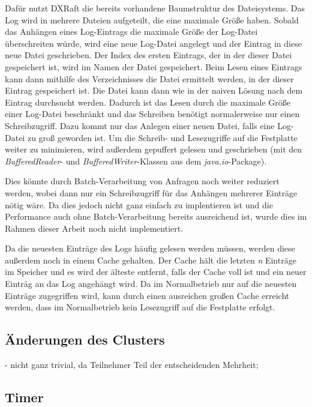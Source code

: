 Dafür nutzt DXRaft die bereits vorhandene Baumstruktur des Dateisystems. Das Log wird in mehrere Dateien aufgeteilt, die eine maximale Größe haben. Sobald das Anhängen eines Log-Eintrags die maximale Größe der Log-Datei überschreiten würde, wird eine neue Log-Datei angelegt und der Eintrag in diese neue Datei geschrieben. Der Index des ersten Eintrags, der in der dieser Datei gespeichert ist, wird im Namen der Datei gespeichert. Beim Lesen eines Eintrags kann dann mithilfe des Verzeichnisses die Datei ermittelt werden, in der dieser Eintrag gespeichert ist. Die Datei kann dann wie in der naiven Lösung nach dem Eintrag durchsucht werden. Dadurch ist das Lesen durch die maximale Größe einer Log-Datei beschränkt und das Schreiben benötigt normalerweise nur einen Schreibzugriff. Dazu kommt nur das Anlegen einer neuen Datei, falls eine Log-Datei zu groß geworden ist. Um die Schreib- und Lesezugriffe auf die Festplatte weiter zu minimieren, wird außerdem gepuffert gelesen und geschrieben (mit den \textit{BufferedReader}- und \textit{BufferedWriter}-Klassen aus dem \textit{java.io}-Package).
		
Dies könnte durch Batch-Verarbeitung von Anfragen noch weiter reduziert werden, wobei dann nur ein Schreibzugriff für das Anhängen mehrerer Einträge nötig wäre. Da dies jedoch nicht ganz einfach zu implentieren ist und die Performance auch ohne Batch-Verarbeitung bereits ausreichend ist, wurde dies im Rahmen dieser Arbeit noch nicht implementiert.

Da die neuesten Einträge des Logs häufig gelesen werden müssen, werden diese außerdem noch in einem Cache gehalten. Der Cache hält die letzten \textit{n} Einträge im Speicher und es wird der älteste entfernt, falls der Cache voll ist und ein neuer Einträg an das Log angehängt wird. Da im Normalbetrieb nur auf die neuesten Einträge zugegriffen wird, kann durch einen ausreichen großen Cache erreicht werden, dass im Normalbetrieb kein Lesezugriff auf die Festplatte erfolgt.

\subsection{Änderungen des Clusters}
\label{config-change}

- nicht ganz trivial, da Teilnehmer Teil der entscheidenden Mehrheit; 

\subsection{Timer}

